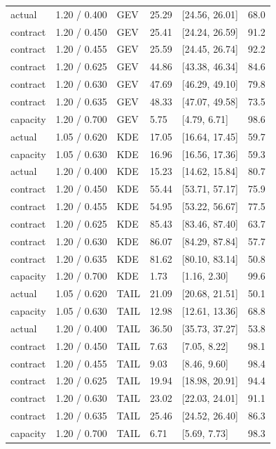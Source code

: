 \begin{longtable}{@{}llllll@{}}
actual & 1.20 / 0.400 & GEV & 25.29 & [24.56, 26.01] & 68.0\\
contract & 1.20 / 0.450 & GEV & 25.41 & [24.24, 26.59] & 91.2\\
contract & 1.20 / 0.455 & GEV & 25.59 & [24.45, 26.74] & 92.2\\
contract & 1.20 / 0.625 & GEV & 44.86 & [43.38, 46.34] & 84.6\\
contract & 1.20 / 0.630 & GEV & 47.69 & [46.29, 49.10] & 79.8\\
contract & 1.20 / 0.635 & GEV & 48.33 & [47.07, 49.58] & 73.5\\
capacity & 1.20 / 0.700 & GEV & 5.75 & [4.79, 6.71] & 98.6\\
actual & 1.05 / 0.620 & KDE & 17.05 & [16.64, 17.45] & 59.7\\
capacity & 1.05 / 0.630 & KDE & 16.96 & [16.56, 17.36] & 59.3\\
actual & 1.20 / 0.400 & KDE & 15.23 & [14.62, 15.84] & 80.7\\
contract & 1.20 / 0.450 & KDE & 55.44 & [53.71, 57.17] & 75.9\\
contract & 1.20 / 0.455 & KDE & 54.95 & [53.22, 56.67] & 77.5\\
contract & 1.20 / 0.625 & KDE & 85.43 & [83.46, 87.40] & 63.7\\
contract & 1.20 / 0.630 & KDE & 86.07 & [84.29, 87.84] & 57.7\\
contract & 1.20 / 0.635 & KDE & 81.62 & [80.10, 83.14] & 50.8\\
capacity & 1.20 / 0.700 & KDE & 1.73 & [1.16, 2.30] & 99.6\\
actual & 1.05 / 0.620 & TAIL & 21.09 & [20.68, 21.51] & 50.1\\
capacity & 1.05 / 0.630 & TAIL & 12.98 & [12.61, 13.36] & 68.8\\
actual & 1.20 / 0.400 & TAIL & 36.50 & [35.73, 37.27] & 53.8\\
contract & 1.20 / 0.450 & TAIL & 7.63 & [7.05, 8.22] & 98.1\\
contract & 1.20 / 0.455 & TAIL & 9.03 & [8.46, 9.60] & 98.4\\
contract & 1.20 / 0.625 & TAIL & 19.94 & [18.98, 20.91] & 94.4\\
contract & 1.20 / 0.630 & TAIL & 23.02 & [22.03, 24.01] & 91.1\\
contract & 1.20 / 0.635 & TAIL & 25.46 & [24.52, 26.40] & 86.3\\
capacity & 1.20 / 0.700 & TAIL & 6.71 & [5.69, 7.73] & 98.3\\
\bottomrule
\end{longtable}
\endgroup
